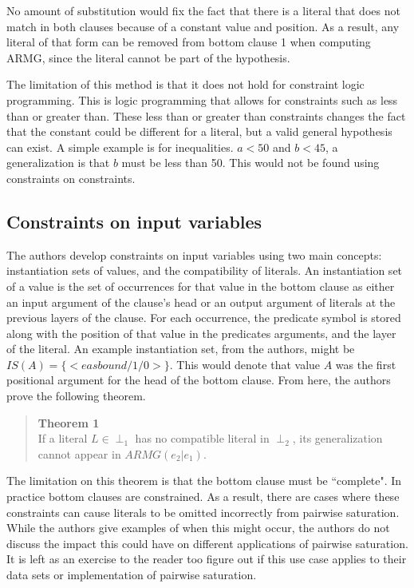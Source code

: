 \documentclass[jair,twoside,11pt,theapa]{article}
\begin{document}
No amount of substitution would fix the fact that there is a literal that does not match in both clauses because of a constant value and position. As a result, any literal of that form can be removed from bottom clause 1 when computing ARMG, since the literal cannot be part of the hypothesis. 

The limitation of this method is that it does not hold for constraint logic programming. This is logic programming that allows for constraints such as less than or greater than. These less than or greater than constraints changes the fact that the constant could be different for a literal, but a valid general hypothesis can exist. A simple example is for inequalities. $a < 50$ and $b < 45$, a generalization is that $b$ must be less than 50. This would not be found using constraints on constraints. 

\subsection{Constraints on input variables}
The authors develop constraints on input variables using two main concepts: instantiation sets of values, and the compatibility of literals. An instantiation set of a value is the set of occurrences for that value in the bottom clause as either an input argument of the clause's head or an output argument of literals at the previous layers of the clause. For each occurrence, the predicate symbol is stored along with the position of that value in the predicates arguments, and the layer of the literal. An example instantiation set, from the authors, might be $IS(A) = \{<easbound/1/0>\}$. This would denote that value $A$ was the first positional argument for the head of the bottom clause. From here, the authors prove the following theorem.

{\small
	\begin{quote}
		{\bf Theorem 1}\\
		If a literal $L \in \perp_1$ has no compatible literal in $\perp_2$, its generalization cannot appear in $ARMG(e_2|e_1)$.
	\end{quote}
}

The limitation on this theorem is that the bottom clause must be ``complete". In practice bottom clauses are constrained. As a result, there are cases where these constraints can cause literals to be omitted incorrectly from pairwise saturation. While the authors give examples of when this might occur, the authors do not discuss the impact this could have on different applications of pairwise saturation. It is left as an exercise to the reader too figure out if this use case applies to their data sets or implementation of pairwise saturation.
\end{document}

